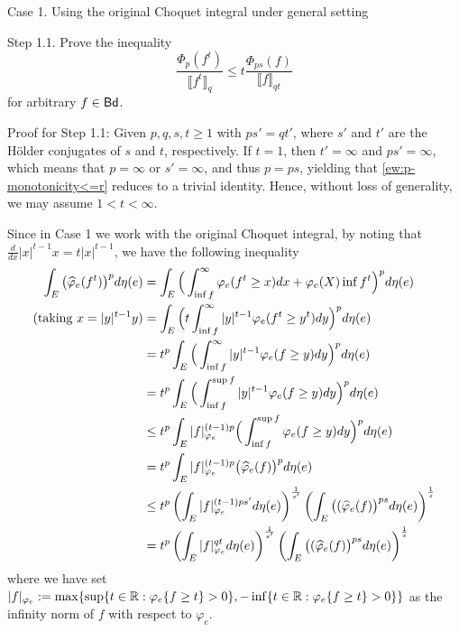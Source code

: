 \documentclass[12pt,a4paper]{article}
\begin{document}
\noindent Case 1. Using the original Choquet integral under general setting  

Step 1.1. Prove the inequality 
\begin{equation}\label{ew:p-monotonicity<=r}
\frac{\Phi_p(f^t)}{ \big\llbracket f^t\big\rrbracket_{q}}\le t\frac{\Phi_{ps}(f)}{\big\llbracket f\big\rrbracket_{qt}}
\end{equation} 
for arbitrary $f\in{\sf Bd}$.

Proof for Step 1.1:  
Given $p,q,s,t\ge1$ with $ps'=qt'$,  where $s'$ and $t'$ are the H\"older conjugates of $s$ and $t$, respectively. 
If $t=1$, then $t'=\infty$ and $ps'=\infty$, which means that $p=\infty$ or $s'=\infty$, and thus $p=ps$, yielding that \eqref{ew:p-monotonicity<=r} reduces to a trivial identity. 
Hence, without loss of generality, we may assume $1<t<\infty$. 

Since in Case 1 we work with the original Choquet integral,  by noting that $\frac{d}{dx}|x|^{t-1}x=t|x|^{t-1}$, we have the following inequality 
\begin{align}
\int_E\big(\widehat{\varphi}_e(f^t)\big)^pd\eta(e)&=\int_E\Big(\int_{\inf f}^\infty \varphi_e(f^t\ge x)dx+\varphi_e(X)\inf f^t\Big)^pd\eta(e) \notag
\\(\text{taking }x=|y|^{t-1}y)&=\int_E\Big(t\int_{\inf f}^\infty |y|^{t-1}\varphi_e(f^t\ge y^t)dy\Big)^pd\eta(e)  \notag
\\&=t^p\int_E\Big(\int_{\inf f}^\infty |y|^{t-1}\varphi_e(f\ge y)dy\Big)^pd\eta(e) \notag 
\\&=t^p\int_E\Big(\int_{\inf f}^{\sup f} |y|^{t-1}\varphi_e(f\ge y)dy\Big)^pd\eta(e) \label{eq:=r^p..} 
\\&\le t^p\int_E|f|_{\varphi_e}^{(t-1)p}\Big(\int_{\inf f}^{\sup f} \varphi_e(f\ge y)dy\Big)^pd\eta(e) \notag
\\&= t^p\int_E|f|_{\varphi_e}^{(t-1)p}\big(\widehat{\varphi}_e(f)\big)^pd\eta(e) \notag
\\&\le t^p\left(\int_E|f|_{\varphi_e}^{(t-1)ps'}d\eta(e)\right)^{\frac{1}{s'}}\left(\int_E\big((\widehat{\varphi}_e(f)\big)^{ps}d\eta(e)\right)^{\frac{1}{s}}\notag
\\&=t^p\left(\int_E|f|_{\varphi_e}^{qt}d\eta(e)\right)^{\frac{1}{s'}}\left(\int_E\big((\widehat{\varphi}_e(f)\big)^{ps}d\eta(e)\right)^{\frac{1}{s}}\notag
\end{align}
where we have set %
$|f|_{\varphi_e}:=\max\{\sup\{t\in \mathbb{R}: \varphi_e\{f\ge t\}> 0\},-\inf\{t\in \mathbb{R}: \varphi_e\{f\ge t\}> 0\}\}$ as the  infinity norm of $f$ with respect to $\varphi_e$. 
\end{document}
